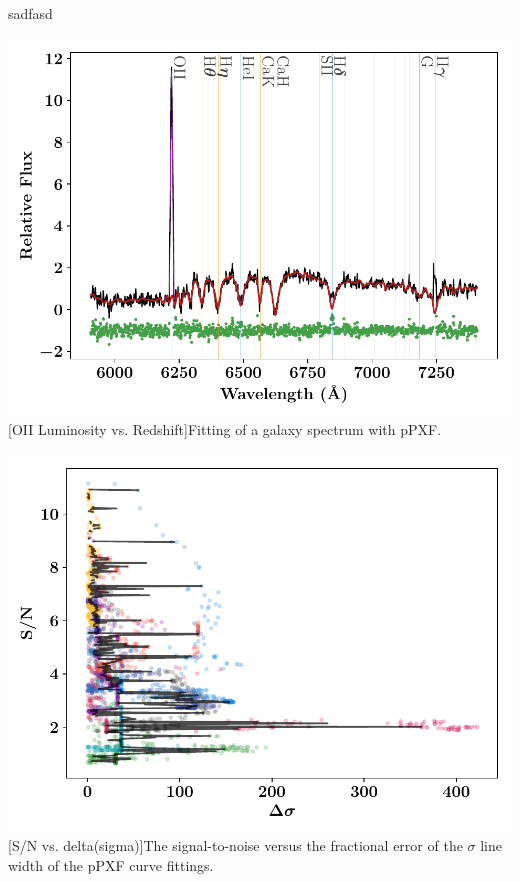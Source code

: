 \documentclass[12pt, twocolumn]{revtex4}    %
\begin{document}
sadfasd

\begin{center}
\includegraphics[width=1.0\linewidth]{data/cube_1804_fitted}
[OII Luminosity vs. Redshift]{Fitting of a galaxy spectrum with pPXF.}
\label{fig:oiiluminosity_redshift}
\end{center}

\begin{center}
\includegraphics[width=1.0\linewidth]{data/reprocessed_sn_vs_delta_sigma}
[S/N vs. delta(sigma)]{The signal-to-noise versus the fractional error of the $\sigma$ line width of the pPXF curve fittings.}
\label{fig:oiiluminosity_redshift}
\end{center}
\end{document}
